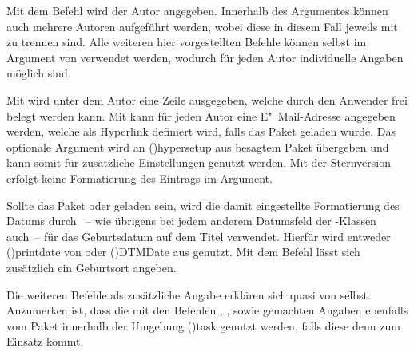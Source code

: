 \begin{DeclareEntity*}{}
\begin{DeclareEntity*}{}
\begin{DeclareEntity*}{}
\begin{Declaration}
\begin{Declaration}
\begin{Declaration}
\begin{Declaration}
\begin{Declaration}
\begin{Declaration}
\begin{Declaration}
\begin{Declaration}
\begin{Declaration}
\begin{Declaration}
Mit dem Befehl  wird der Autor angegeben. Innerhalb des 
Argumentes können auch mehrere Autoren aufgeführt werden, wobei diese in diesem 
Fall jeweils mit  zu trennen sind. Alle weiteren hier vorgestellten 
Befehle können selbst im Argument von  verwendet werden, wodurch 
für jeden Autor individuelle Angaben möglich sind.

Mit  wird unter dem Autor eine Zeile ausgegeben, welche 
durch den Anwender frei belegt werden kann. Mit  kann für 
jeden Autor eine E"~Mail-Adresse angegeben werden, welche als Hyperlink
definiert wird, falls das Paket  geladen wurde. Das optionale 
Argument wird an \Macro(){hypersetup} aus besagtem
Paket übergeben und kann somit für zusätzliche Einstellungen genutzt werden. 
Mit der Sternversion  erfolgt keine Formatierung des 
Eintrags im Argument.

Sollte das Paket  oder  geladen sein, wird 
die damit eingestellte Formatierung des Datums durch ~-- wie 
übrigens bei jedem anderem Datumsfeld der \TUDScript-Klassen auch~-- für das 
Geburtsdatum auf dem Titel verwendet. Hierfür wird entweder 
\Macro(){printdate} von  oder 
\Macro(){DTMDate} aus  genutzt. Mit 
dem Befehl  lässt sich zusätzlich ein Geburtsort angeben.

Die weiteren Befehle als zusätzliche Angabe erklären sich quasi von selbst. 
Anzumerken ist, dass die mit den Befehlen , 
,  sowie  gemachten 
Angaben ebenfalls vom Paket  innerhalb der 
Umgebung \Environment(){task} genutzt werden, falls 
diese denn zum Einsatz kommt.
\end{Declaration}
\end{Declaration}
\end{Declaration}
\end{Declaration}
\end{Declaration}
\end{Declaration}
\end{Declaration}
\end{Declaration}
\end{Declaration}
\end{Declaration}

\begin{Declaration}
  {}


\end{Declaration}
\end{DeclareEntity*}
\end{DeclareEntity*}
\end{DeclareEntity*}
